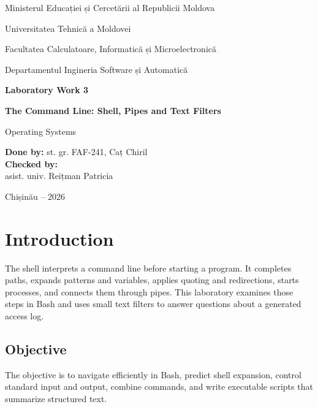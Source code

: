 \documentclass[12pt]{article}
\begin{document}
\begin{titlepage}
\centering
{\large Ministerul Educației și Cercetării al Republicii Moldova\par}
\vspace{0.45cm}
{\large Universitatea Tehnică a Moldovei\par}
\vspace{0.45cm}
{\large Facultatea Calculatoare, Informatică și Microelectronică\par}
    \vspace{0.45cm}
    {\large Departamentul Ingineria Software și Automatică\par}
\vspace{3cm}
{\Large\bfseries Laboratory Work 3\par}
\vspace{0.55cm}
{\LARGE\bfseries The Command Line: Shell, Pipes and Text Filters\par}
\vspace{0.35cm}
{\large Operating Systems\par}
\vfill
\begin{flushleft}
\textbf{Done by:} st. gr. FAF-241, Caț Chiril\\
\vspace{1cm}
\textbf{Checked by:}\\
asist. univ. Reițman Patricia
\end{flushleft}
\vfill
{Chișinău -- 2026\par}
\end{titlepage}

\tableofcontents
\clearpage
{}

\section*{Introduction}
The shell interprets a command line before starting a program. It completes paths, expands patterns and variables, applies quoting and redirections, starts processes, and connects them through pipes. This laboratory examines those steps in Bash and uses small text filters to answer questions about a generated access log.

\subsection*{Objective}
The objective is to navigate efficiently in Bash, predict shell expansion, control standard input and output, combine commands, and write executable scripts that summarize structured text.
\end{document}
